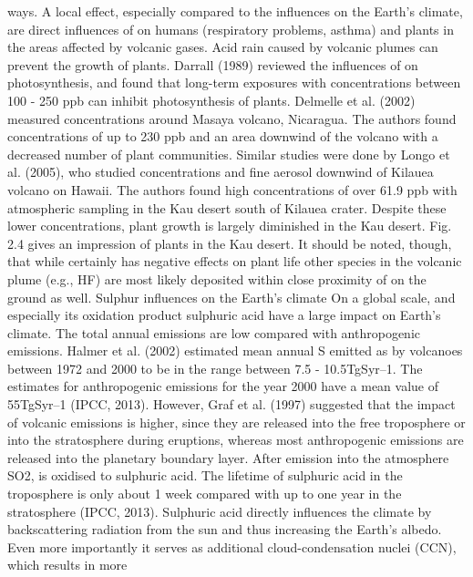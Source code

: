 \documentclass  [
  paper    = a4,
  BCOR     = 10mm,
  twoside,
  fontsize = 12pt,
  fleqn,
  toc      = bibnumbered,
  toc      = listofnumbered,
  numbers  = noendperiod,
  headings = normal,
  listof   = leveldown,
  version  = 3.03
]                                       {scrreprt}
\begin{document}
{	ways. A local effect, especially
	compared to the influences on the
	Earth’s climate, are direct influences
	of  on humans (respiratory problems,
	asthma) and plants in the areas
	affected by volcanic gases. Acid rain
	caused by volcanic plumes can prevent
	the growth of plants. Darrall (1989)
	reviewed the influences of  on photosynthesis,
	and found that long-term
	exposures with  concentrations between
	100 - 250 ppb can inhibit photosynthesis
	of plants. Delmelle et al.
	(2002) measured  concentrations
	around Masaya volcano, Nicaragua.
	The authors found concentrations of
	up to 230 ppb and an area downwind
	of the volcano with a decreased number
	of plant communities. Similar
	studies were done by Longo et al.
	(2005), who studied  concentrations
	and fine aerosol downwind of Kilauea
	volcano on Hawaii. The authors
	found high  concentrations of over
	61.9 ppb with atmospheric sampling in the Kau desert south of Kilauea crater.
	Despite these lower  concentrations, plant growth is largely diminished in the
	Kau desert. Fig. 2.4 gives an impression of plants in the Kau desert. It should be
	noted, though, that while  certainly has negative effects on plant life other
	species in the volcanic plume (e.g., HF) are most likely deposited within close
	proximity of  on the ground as well.
	Sulphur influences on the Earth’s climate
	On a global scale,  and especially its oxidation product sulphuric acid have
	a large impact on Earth’s climate. The total annual  emissions are low
	compared with anthropogenic emissions. Halmer et al. (2002) estimated mean
	annual S emitted as  by volcanoes between 1972 and 2000 to be in the range
	between 7.5 - 10.5TgSyr–1. The estimates for anthropogenic  emissions for
	the year 2000 have a mean value of 55TgSyr–1 (IPCC, 2013). However, Graf et al.
	(1997) suggested that the impact of volcanic  emissions is higher, since they
	are released into the free troposphere or into the stratosphere during eruptions,
	whereas most anthropogenic emissions are released into the planetary boundary
	layer. After emission into the atmosphere SO2, is oxidised to sulphuric acid. The
	lifetime of sulphuric acid in the troposphere is only about 1 week compared with
	up to one year in the stratosphere (IPCC, 2013).
	Sulphuric acid directly influences the climate by backscattering radiation
	from the sun and thus increasing the Earth’s albedo. Even more importantly
	it serves as additional cloud-condensation nuclei (CCN), which results in more
}
\end{document}
